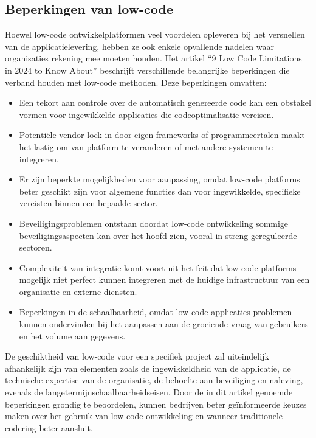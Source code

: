 \subsection{Beperkingen van low-code}
Hoewel low-code ontwikkelplatformen veel voordelen opleveren bij het versnellen van de applicatielevering, hebben ze ook enkele opvallende nadelen waar organisaties rekening mee moeten houden. Het artikel “9 Low Code Limitations in 2024 to Know About” \autocite{Malak2024} beschrijft verschillende belangrijke beperkingen die verband houden met low-code methoden. Deze beperkingen omvatten:

\begin{itemize}
    \item Een tekort aan controle over de automatisch genereerde code kan een obstakel vormen voor ingewikkelde applicaties die codeoptimalisatie vereisen.
    \item Potentiële vendor lock-in door eigen frameworks of programmeertalen maakt het lastig om van platform te veranderen of met andere systemen te integreren.
    \item Er zijn beperkte mogelijkheden voor aanpassing, omdat low-code platforms beter geschikt zijn voor algemene functies dan voor ingewikkelde, specifieke vereisten binnen een bepaalde sector.
    \item Beveiligingsproblemen ontstaan doordat low-code ontwikkeling sommige beveiligingsaspecten kan over het hoofd zien, vooral in streng gereguleerde sectoren.
    \item Complexiteit van integratie komt voort uit het feit dat low-code platforms mogelijk niet perfect kunnen integreren met de huidige infrastructuur van een organisatie en externe diensten.
    \item Beperkingen in de schaalbaarheid, omdat low-code applicaties problemen kunnen ondervinden bij het aanpassen aan de groeiende vraag van gebruikers en het volume aan gegevens.
\end{itemize}
De geschiktheid van low-code voor een specifiek project zal uiteindelijk afhankelijk zijn van elementen zoals de ingewikkeldheid van de applicatie, de technische expertise van de organisatie, de behoefte aan beveiliging en naleving, evenals de langetermijnschaalbaarheidseisen. Door de in dit artikel genoemde beperkingen grondig te beoordelen, kunnen bedrijven beter geïnformeerde keuzes maken over het gebruik van low-code ontwikkeling en wanneer traditionele codering beter aansluit.

